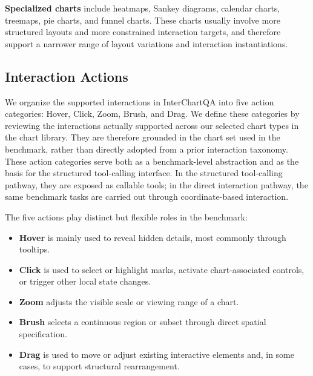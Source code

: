 \documentclass[review,journal,hideappendix]{vgtc} %
\newcommand{\dataset}{InterChartQA}
\newcommand{\placeholder}[1]{\textcolor{red}{\textbf{[Placeholder: #1]}}}
\begin{document}
\textbf{Specialized charts} include heatmaps, Sankey diagrams, calendar charts, treemaps, pie charts, and funnel charts. These charts usually involve more structured layouts and more constrained interaction targets, and therefore support a narrower range of layout variations and interaction instantiations.

\subsection{Interaction Actions}

We organize the supported interactions in \dataset{} into five action categories: Hover, Click, Zoom, Brush, and Drag.
We define these categories by reviewing the interactions actually supported across our selected chart types in the chart library. They are therefore grounded in the chart set used in the benchmark, rather than directly adopted from a prior interaction taxonomy.
These action categories serve both as a benchmark-level abstraction and as the basis for the structured tool-calling interface. In the structured tool-calling pathway, they are exposed as callable tools; in the direct interaction pathway, the same benchmark tasks are carried out through coordinate-based interaction.

The five actions play distinct but flexible roles in the benchmark:
\begin{itemize}[leftmargin=*]
    \item \textbf{Hover} is mainly used to reveal hidden details, most commonly through tooltips.
    \item \textbf{Click} is used to select or highlight marks, activate chart-associated controls, or trigger other local state changes.
    \item \textbf{Zoom} adjusts the visible scale or viewing range of a chart.
    \item \textbf{Brush} selects a continuous region or subset through direct spatial specification.
    \item \textbf{Drag} is used to move or adjust existing interactive elements and, in some cases, to support structural rearrangement.
\end{itemize}
\end{document}
